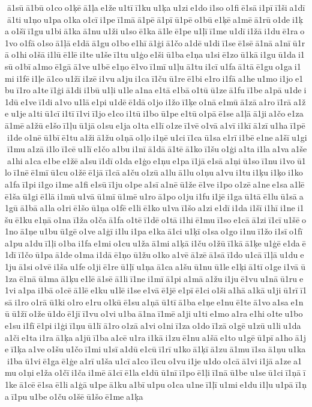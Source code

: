  ā1sū ā1bū o1co o1ķē ā1ļa e1že u1tī ī1ku u1ķa u1zi e1do i1so o1fi ē1sā i1pī ī1ši a1dī ā1ti u1ņo u1pa o1ka o1cī i1pe ī1mā ā1pē ā1pī ū1pē o1bū e1ķē a1mē ā1rū o1de i1ķa o1šī ī1gu u1bi ā1ka ā1nu u1ži u1so ē1ka ā1le ē1pe u1ļī ī1me u1dī i1žā i1du ē1ra o1vo o1fā o1so ā1ļā e1dā ā1gu o1bo e1hī ā1ģi ā1čo a1dē u1di ī1se ē1sē ā1nā a1nī ū1rā o1hi o1šā i1lū ē1lē i1te u1še ī1tu u1ģo e1ši ū1ba e1ņa u1si ē1zo ū1kā i1gu ū1da i1sū o1bī a1mo ē1gā ā1ve u1bē e1ņo ē1vo ī1mī u1ļu ā1tu i1cī u1fa ā1tā ē1gu o1ga i1mi i1fē i1ļe ā1co u1žī i1zē i1vu a1ju i1ca ī1ču ū1re ē1bi e1ro i1fā a1he u1mo i1jo e1bu ī1ro a1te ī1ģi ā1di i1bū u1ļi u1le a1na e1tā e1bā o1tū ū1ze ā1fu ī1be a1pā u1de i1dū e1ve ī1di a1vo u1lā e1pi u1dē ē1dā o1jo i1žo ī1ķe o1nā e1mū ā1zā a1ro ī1rā a1že u1je a1ti ū1cī i1tī ī1vi ī1jo e1co i1tū i1bo ū1pe e1tū o1pā ē1se a1ļā ā1ji a1čo e1za ā1mē a1žū e1šo ī1ļu ū1jā o1su e1ja o1ta e1lī o1ze ī1vē o1vā a1vī i1kī ā1zī u1ha ī1pē i1de o1nē ū1bī ē1tu a1ži ā1žu o1ņā o1ļo i1ņē u1ci ī1ca ū1sa e1rī i1bē e1ne a1šī u1gi ī1mu a1zā i1lo ī1cē u1lī e1čo a1bu i1nī ā1dā ā1tē ā1ko ī1šu o1ģi a1ta i1la a1va a1še a1hi a1ca e1be e1žē a1su ī1dī o1da e1ģo e1ņu e1pa ī1jā e1sā a1ņi ū1so ī1nu i1vo ū1lo ī1nē ē1mī ū1cu o1žē ē1jā ī1cā a1ču o1zū a1lu ā1lu o1ņu a1vu i1tu i1ķu i1ķo i1ko a1fa ī1pi i1go i1me a1fi e1sū ī1ju o1pe a1sī a1nē ū1že ē1ve i1po o1zē a1ne e1sa a1lē ē1ša ū1gi ē1lā i1mū u1vā ū1mī ū1mē u1ro ā1po o1ju i1fu i1jē i1ga ū1tā ē1lu ū1sā a1gū ā1bā a1la o1ri ē1šo ū1ņa o1fē e1li ē1ko u1va ī1šo a1zi e1dī i1da i1šī i1hī i1ne i1šu ē1ku e1ņā o1na ī1ža o1ča ā1fa o1tē ī1dē o1tā i1hi ē1mu ī1so e1cā ā1zi ī1cī u1šē o1no ā1ņe u1bu ū1gē o1ve a1ģī i1lu i1pa e1ka ā1ci u1ķī o1sa o1go i1nu ī1žo i1sī o1fī a1pu a1du ī1ļi o1ba i1fa e1mi o1cu u1ža ā1mi a1ķā i1ču o1žū ī1kā ā1ķe u1ģē e1da ē1dī ī1čo ū1pa ā1de o1ma i1dā ē1ņo ū1žu o1ko a1vē ā1zē ā1sā ī1do u1cā ī1ļā u1du e1ju ā1si o1vē i1ša u1fe o1ji ē1re ū1ļī u1ņa ā1ca a1šu ū1nu ū1le e1ķi ā1tī o1ge i1vā ū1za ē1nā ū1ma ā1ķu e1lē ā1sē ā1li ī1ne i1mī ā1pi a1mā a1žu i1ju ē1vu u1nā ū1ru e1vi a1pa i1bā o1cē ā1lē e1ku u1lē i1se e1vā ē1jē e1pī ē1ci o1ši a1hā a1kā u1ji ū1rī ī1sā i1ro o1rā ū1ki o1ro e1ru o1kū ē1su a1ņā ū1tī ā1ba e1ņe e1nu ē1te ā1vo a1sa e1nū ū1žī o1že ū1do ē1jī ī1vu o1vi u1ba ā1na ī1mē a1ji u1ti e1mo a1ra e1hi o1te u1bo e1su i1fī ē1pi i1ģi ī1ņu ū1lī ā1ro o1zā a1vi o1ni ī1za o1do ī1zā o1gē u1zū u1li u1da a1či e1ta i1ra ā1ķa a1jū ī1ba a1cē u1ra i1kā i1zu ē1nu a1šā e1to u1gē ū1pī a1ho ā1je ī1ķa a1ve o1šu u1čo ī1mi u1sī a1dū e1cū ī1rī u1ko ā1ķī ā1zu ā1mu ī1sa ā1ņu u1ka i1ba ū1vi ē1ga ē1ģe a1rī u1ša u1cī a1co ī1cu o1vu i1je u1do o1cā ā1vi i1jā a1ze a1mu o1ņi e1ža o1čī i1ča i1mē ā1cī ē1la e1dū ū1nī ī1po ē1ļi ī1nā ū1be u1se ū1ci ī1ņā ī1ke ā1cē ē1sa ē1li a1ģā u1pe ā1ku a1bī u1pu o1ca u1ne ī1ļī u1mi e1du i1ļu u1pā ī1ņa ī1pu u1be o1ču o1šē ū1šo ē1me a1ķa